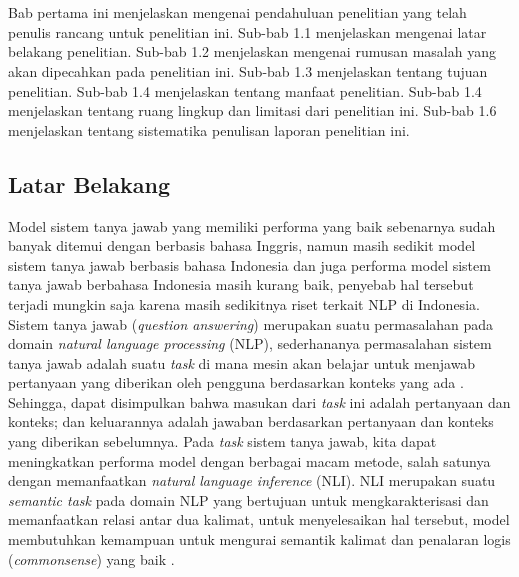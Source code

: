 \chapter{\babSatu}
\label{bab:1}
Bab pertama ini menjelaskan mengenai pendahuluan penelitian yang telah penulis rancang untuk penelitian ini. Sub-bab 1.1 menjelaskan mengenai latar belakang penelitian. Sub-bab 1.2 menjelaskan mengenai rumusan masalah yang akan dipecahkan pada penelitian ini. Sub-bab 1.3 menjelaskan tentang tujuan penelitian. Sub-bab 1.4 menjelaskan tentang manfaat penelitian. Sub-bab 1.4 menjelaskan tentang ruang lingkup dan limitasi dari penelitian ini. Sub-bab 1.6 menjelaskan tentang sistematika penulisan laporan penelitian ini.

\section{Latar Belakang}
Model sistem tanya jawab yang memiliki performa yang baik sebenarnya sudah banyak ditemui dengan berbasis bahasa Inggris, namun masih sedikit model sistem tanya jawab berbasis bahasa Indonesia dan juga performa model sistem tanya jawab berbahasa Indonesia masih kurang baik, penyebab hal tersebut terjadi mungkin saja karena masih sedikitnya riset terkait NLP di Indonesia. Sistem tanya jawab (\emph{question answering}) merupakan suatu permasalahan pada domain \emph{natural language processing} (NLP), sederhananya permasalahan sistem tanya jawab adalah suatu \emph{task} di mana mesin akan belajar untuk menjawab pertanyaan yang diberikan oleh pengguna berdasarkan konteks yang ada \citep{stroh2016question}. Sehingga, dapat disimpulkan bahwa masukan dari \emph{task} ini adalah pertanyaan dan konteks; dan keluarannya adalah jawaban berdasarkan pertanyaan dan konteks yang diberikan sebelumnya. Pada \emph{task} sistem tanya jawab, kita dapat meningkatkan performa model dengan berbagai macam metode, salah satunya dengan memanfaatkan \emph{natural language inference} (NLI). NLI merupakan suatu \emph{semantic task} pada domain NLP yang bertujuan untuk mengkarakterisasi dan memanfaatkan relasi antar dua kalimat, untuk menyelesaikan hal tersebut, model membutuhkan kemampuan untuk mengurai semantik kalimat dan penalaran logis (\emph{commonsense}) yang baik \citep{bowman-etal-2015-large}.

